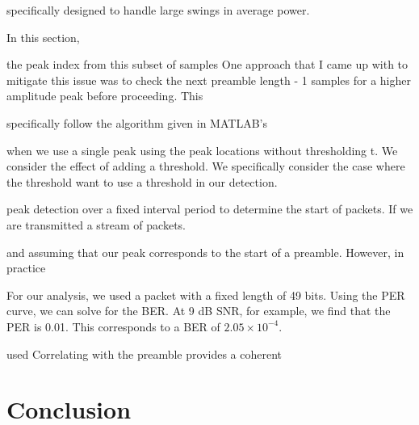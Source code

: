 \documentclass{article}
\begin{document}
\noindent specifically designed to handle large swings in average power.

In this section, 


	 the peak index from this subset of samples  One approach that I came up with to mitigate this issue was to check the next preamble length - 1 samples for a higher amplitude peak before proceeding. This 
	
 specifically follow the algorithm given in MATLAB's 

 when we use a single peak using the peak locations without thresholding t. We consider the effect of adding a threshold. We specifically consider the case where the threshold  want to use a threshold in our detection.

 peak detection over a fixed interval period to determine the start of packets. If we are transmitted a stream of packets. 

and assuming that our peak corresponds to the start of a preamble. However, in practice 

For our analysis, we used a packet with a fixed length of 49 bits. Using the PER curve, we can solve for the BER. At 9 dB SNR, for example, we find that the PER is 0.01. This corresponds to a BER of $2.05 \times 10^{-4}$.


 used Correlating with the preamble provides a coherent 
\section{Conclusion}


{}
\end{document}
